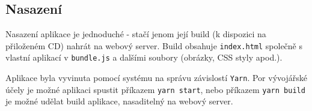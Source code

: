 \subsection{Nasazení}
Nasazení aplikace je jednoduché - stačí jenom její build (k dispozici na přiloženém CD) nahrát na webový server. Build obsahuje \texttt{index.html} společně s vlastní aplikací v \texttt{bundle.js} a dalšími soubory (obrázky, CSS styly apod.).

Aplikace byla vyvinuta pomocí systému na správu závislostí \texttt{Yarn}. Por vývojářské účely je možné aplikaci spustit příkazem \texttt{yarn start}, nebo příkazem \texttt{yarn build} je možné udělat build aplikace, nasaditelný na webový server.